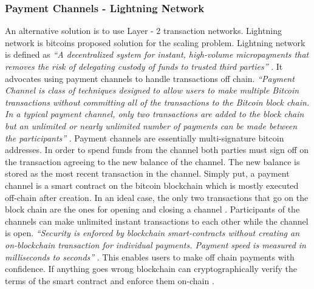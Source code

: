 \subsubsection{Payment Channels - Lightning Network}
An alternative solution is to use Layer - 2 transaction networks. Lightning network is bitcoins proposed solution for the scaling problem. Lightning network is defined as \textit{“A decentralized system for instant, high-volume micropayments that removes the risk of delegating custody of funds to trusted third parties”} \cite{paper:002}. It advocates using payment channels to handle transactions off chain. \textit{“Payment Channel is class of techniques designed to allow users to make multiple Bitcoin transactions without committing all of the transactions to the Bitcoin block chain. In a typical payment channel, only two transactions are added to the block chain but an unlimited or nearly unlimited number of payments can be made between the participants”} \cite{bitwiki:006}.  Payment channels are essentially multi-signature bitcoin addresses. In order to spend funds from the channel both parties must sign off on the transaction agreeing to the new balance of the channel. The new balance is stored as the most recent transaction in the channel. Simply put, a payment channel is a smart contract on the bitcoin blockchain which is mostly executed off-chain after creation. In an ideal case, the only two transactions that go on the block chain are the ones for opening and closing a channel \cite{misc:011}. Participants of the channels can make unlimited instant transactions to each other while the channel is open. \textit{“Security is enforced by blockchain smart-contracts without creating an on-blockchain transaction for individual payments. Payment speed is measured in milliseconds to seconds”} \cite{paper:002}. This enables users to make off chain payments with confidence. If anything goes wrong blockchain can cryptographically verify the terms of the smart contract and enforce them on-chain \cite{bitwiki:006} \cite{misc:012}.
\clearpage
